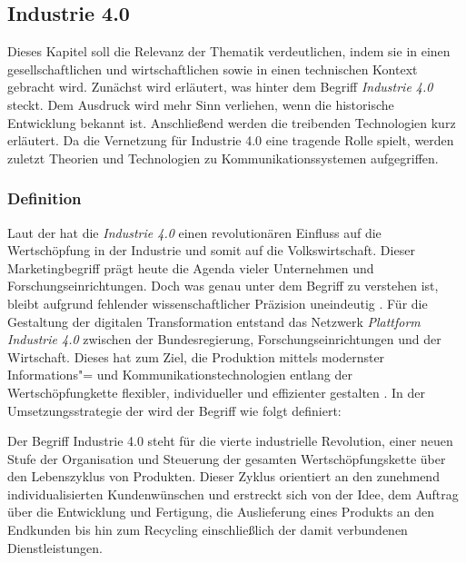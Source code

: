 \subsection{Industrie 4.0}
Dieses Kapitel soll die Relevanz der Thematik verdeutlichen, indem sie in einen gesellschaftlichen und wirtschaftlichen sowie in einen technischen Kontext gebracht wird. Zunächst wird erläutert, was hinter dem Begriff \textit{Industrie 4.0} steckt. Dem Ausdruck wird mehr Sinn verliehen, wenn die historische Entwicklung bekannt ist. Anschließend werden die treibenden Technologien kurz erläutert. Da die Vernetzung für Industrie 4.0 eine tragende Rolle spielt, werden zuletzt Theorien und Technologien zu Kommunikationssystemen aufgegriffen.
\subsubsection{Definition}

Laut der \cite{FraunhoferGesellschaft2016} hat die \textit{Industrie 4.0} einen revolutionären Einfluss auf die Wertschöpfung in der Industrie und somit auf die Volkswirtschaft. Dieser Marketingbegriff prägt heute die Agenda vieler Unternehmen und Forschungseinrichtungen. Doch was genau unter dem Begriff zu verstehen ist, bleibt aufgrund fehlender  \glqq wissenschaftlicher Präzision\grqq{} uneindeutig \citep{Bendel2019}. Für die Gestaltung der digitalen Transformation entstand das Netzwerk \textit{Plattform Industrie 4.0} zwischen der Bundesregierung, Forschungseinrichtungen und der Wirtschaft. Dieses hat zum Ziel, die Produktion mittels modernster Informations"= und Kommunikationstechnologien entlang der Wertschöpfungkette \glqq flexibler, individueller und effizienter\grqq{} gestalten \citep{BWE2019}. In der Umsetzungsstrategie der \citet[S. 8]{BITKOM2015} wird der Begriff wie folgt definiert:

\begin{displayquote} \glqq Der Begriff Industrie 4.0 steht für die vierte industrielle Revolution, einer neuen Stufe der Organisation und Steuerung der gesamten Wertschöpfungskette über den Lebenszyklus von Produkten. Dieser Zyklus orientiert an den zunehmend individualisierten Kundenwünschen und erstreckt sich von der Idee, dem Auftrag über die Entwicklung und Fertigung, die Auslieferung eines Produkts an den Endkunden bis hin zum Recycling einschließlich der damit verbundenen Dienstleistungen.\grqq{}
\end{displayquote}


